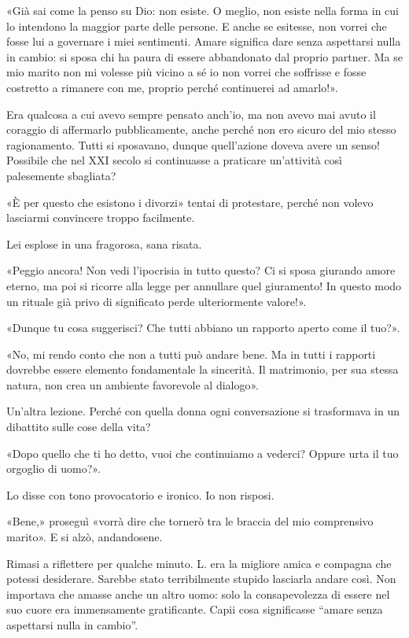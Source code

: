 \documentclass[a4paper,12pt]{book}
\begin{document}
«Già sai come la penso su Dio: non esiste. O meglio, non esiste nella forma in
cui lo intendono la maggior parte delle persone. E anche se esitesse, non vorrei
che fosse lui a governare i miei sentimenti. Amare significa dare senza aspettarsi
nulla in cambio: si sposa chi ha paura di essere abbandonato dal proprio partner.
Ma se mio marito non mi volesse più vicino a sé io non vorrei che soffrisse e
fosse costretto a rimanere con me, proprio perché continuerei ad amarlo!».

Era qualcosa a cui avevo sempre pensato anch'io, ma non avevo mai avuto il
coraggio di affermarlo pubblicamente, anche perché non ero sicuro del mio stesso
ragionamento. Tutti si sposavano, dunque quell'azione doveva avere un senso!
Possibile che nel XXI secolo si continuasse a praticare un'attività così
palesemente sbagliata?

«È per questo che esistono i divorzi» tentai di protestare, perché non volevo
lasciarmi convincere troppo facilmente.

Lei esplose in una fragorosa, sana risata.

«Peggio ancora! Non vedi l'ipocrisia in tutto questo? Ci si sposa giurando amore
eterno, ma poi si ricorre alla legge per annullare quel giuramento! In questo
modo un rituale già privo di significato perde ulteriormente valore!».

«Dunque tu cosa suggerisci? Che tutti abbiano un rapporto aperto come il tuo?».

«No, mi rendo conto che non a tutti può andare bene. Ma in tutti i rapporti
dovrebbe essere elemento fondamentale la sincerità. Il matrimonio, per sua
stessa natura, non crea un ambiente favorevole al dialogo».

Un'altra lezione. Perché con quella donna ogni conversazione si trasformava in
un dibattito sulle cose della vita?

«Dopo quello che ti ho detto, vuoi che continuiamo a vederci? Oppure urta il tuo
orgoglio di uomo?».

Lo disse con tono provocatorio e ironico. Io non risposi.

«Bene,» proseguì «vorrà dire che tornerò tra le braccia del mio comprensivo
marito». E si alzò, andandosene.

Rimasi a riflettere per qualche minuto. L. era la migliore amica e compagna che
potessi desiderare. Sarebbe stato terribilmente stupido lasciarla andare così.
Non importava che amasse anche un altro uomo: solo la consapevolezza di essere
nel suo cuore era immensamente gratificante. Capii cosa significasse ``amare
senza aspettarsi nulla in cambio''.
\end{document}
